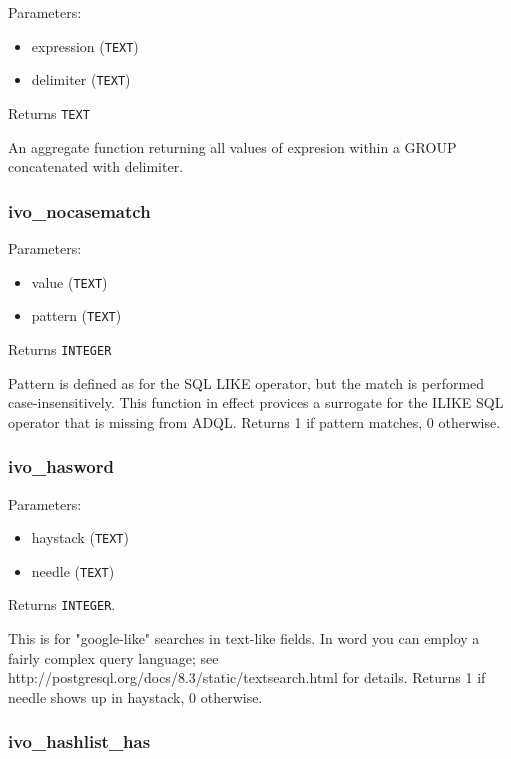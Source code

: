 \documentclass[11pt,a4paper]{ivoa}
\begin{document}
Parameters:

\begin{itemize}
	\item expression (\texttt{TEXT})
	\item delimiter (\texttt{TEXT})
\end{itemize}

Returns \texttt{TEXT}

An aggregate function returning all values of expresion within a GROUP
concatenated with delimiter.

\subsubsection{ivo\_nocasematch}

Parameters:

\begin{itemize}
	\item value (\texttt{TEXT})
	\item pattern (\texttt{TEXT})
\end{itemize}

Returns \texttt{INTEGER}

Pattern is defined as for the SQL LIKE operator, but the match is
performed case-insensitively. This function in effect provices a
surrogate for the ILIKE SQL operator that is missing from ADQL. Returns
1 if pattern matches, 0 otherwise.

\subsubsection{ivo\_hasword}

Parameters:

\begin{itemize}
	\item haystack (\texttt{TEXT})
	\item needle (\texttt{TEXT})
\end{itemize}

Returns \texttt{INTEGER}.

This is for "google-like" searches in text-like fields. In word you can
employ a fairly complex query language; see
http://postgresql.org/docs/8.3/static/textsearch.html for details.
Returns 1 if needle shows up in haystack, 0 otherwise.

\subsubsection{ivo\_hashlist\_has}
\end{document}
